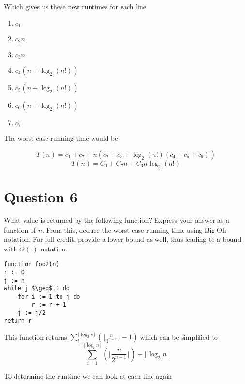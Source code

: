 \documentclass{article}
\begin{document}
Which gives us these new runtimes for each line

\begin{enumerate}

\item $c_{1}$
\item $c_{2}n$
\item $c_{3}n$
\item $c_{4}(n + \log_{2}(n!))$
\item $c_{5}(n + \log_{2}(n!))$
\item $c_{6}(n + \log_{2}(n!))$
\item $c_{7}$

\end{enumerate}
The worst case running time would be

$$T(n) = c_{1}+c_{7} + n(c_{2} + c_{3}+\log_{2}(n!)(c_{4} + c_{5} + c_{6}))$$
$$T(n) = C_{1} +C_{2}n + C_{3}n\log_{2}(n!)$$

\section*{Question 6}
What value is returned by the following function? Express your answer as a function of $n$.
From this, deduce the worst-case running time using Big Oh notation. For full credit, provide a lower bound as well, thus leading to a bound with $\Theta( \cdot )$ notation.

\begin{lstlisting}
function foo2(n)
r := 0
j := n
while j $\geq$ 1 do
    for i := 1 to j do
        r := r + 1
    j := j/2
return r

\end{lstlisting}

This function returns $ \sum_{i=1}^{\lfloor \log_{2}n \rfloor} (\lfloor \frac{n}{2^{n-1}} \rfloor - 1) $ which can be simplified to
$$ \sum_{i=1}^{\lfloor \log_{2}n \rfloor} (\lfloor \frac{n}{2^{n-1}} \rfloor) - \lfloor \log_{2}n \rfloor $$

To determine the runtime we can look at each line again
\end{document}
